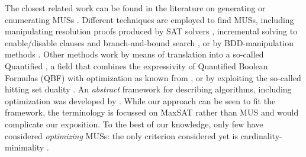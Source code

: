 The closest related work can be found in the literature on generating or enumerating MUSs \cite{conf/sat/LynceM04}.
Different techniques are employed to find MUSs, including  manipulating resolution proofs produced by SAT solvers \cite{goldberg,DBLP:journals/fmsd/GershmanKS08,DBLP:conf/sat/DershowitzHN06}, incremental solving to enable/disable clauses and branch-and-bound search \cite{DBLP:conf/dac/OhMASM04}, or by BDD-manipulation methods \cite{huang}.
Other methods work by means of translation into a so-called Quantified \maxsat \cite{DBLP:journals/constraints/IgnatievJM16}, a field that combines the expressivity of Quantified Boolean Formulas (QBF)  with optimization as known from \maxsat {}, or by exploiting the so-called hitting set duality \cite{ignatiev2015smallest}. 
An \textit{abstract} framework for describing \hitsetbased algorithms, including optimization was developed by \citet{DBLP:conf/kr/SaikkoWJ16}. While our approach can be seen to fit the framework, the terminology is focussed on MaxSAT rather than MUS and would complicate our exposition.
To the best of our knowledge, only few have considered \emph{optimizing} MUSs: the only criterion considered yet is cardinality-minimality \cite{conf/sat/LynceM04,ignatiev2015smallest}. 




